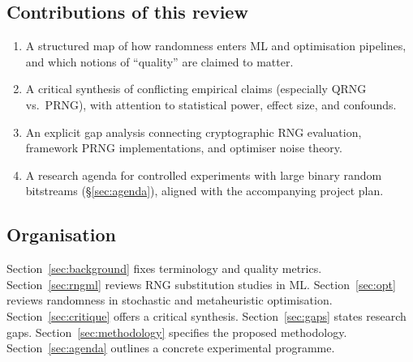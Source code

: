 \subsection{Contributions of this review}

\begin{enumerate}[leftmargin=*]
  \item A structured map of how randomness enters ML and optimisation pipelines, and which notions of ``quality'' are claimed to matter.
  \item A critical synthesis of conflicting empirical claims (especially QRNG vs.\ PRNG), with attention to statistical power, effect size, and confounds.
  \item An explicit gap analysis connecting cryptographic RNG evaluation, framework PRNG implementations, and optimiser noise theory.
  \item A research agenda for controlled experiments with large binary random bitstreams (\S\ref{sec:agenda}), aligned with the accompanying project plan.
\end{enumerate}

\subsection{Organisation}

Section~\ref{sec:background} fixes terminology and quality metrics.
Section~\ref{sec:rngml} reviews RNG substitution studies in ML.
Section~\ref{sec:opt} reviews randomness in stochastic and metaheuristic optimisation.
Section~\ref{sec:critique} offers a critical synthesis.
Section~\ref{sec:gaps} states research gaps.
Section~\ref{sec:methodology} specifies the proposed methodology.
Section~\ref{sec:agenda} outlines a concrete experimental programme.
